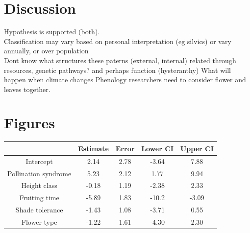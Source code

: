 \documentclass{article}\usepackage[]{graphicx}\usepackage[]{color}
\begin{document}
\section{Discussion}
Hypothesis is supported (both).\\
Classification may vary based on personal interpretation (eg silvics) or vary annually, or over population\\
Dont know what structures these paterns (external, internal)
related through resources, genetic pathways? and perhaps function (hysteranthy)
What will happen when climate changes
Phenology researchers need to consider flower and leaves together.

\section{Figures}

\begin{table}[H]
\begin{tabular}{|c|c|c|c|c|}
\hline
 &Estimate&Error&Lower CI& Upper CI\\
 \hline
Intercept&2.14&2.78&-3.64&7.88\\
\hline
Pollination syndrome&5.23&2.12&1.77&9.94\\
\hline
Height class&-0.18&1.19&-2.38&2.33\\
\hline
Fruiting time&-5.89&1.83&-10.2&-3.09\\
\hline
Shade tolerance&-1.43&1.08&-3.71&0.55\\
\hline
Flower type&-1.22&1.61&-4.30&2.30\\
\hline

\end{tabular}
\end{table}
\end{document}
